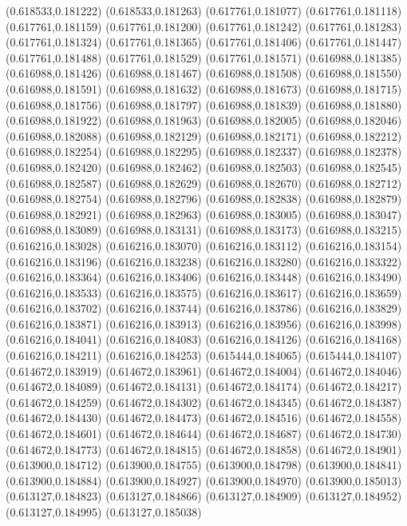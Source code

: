 (0.618533,0.181222)
(0.618533,0.181263)
(0.617761,0.181077)
(0.617761,0.181118)
(0.617761,0.181159)
(0.617761,0.181200)
(0.617761,0.181242)
(0.617761,0.181283)
(0.617761,0.181324)
(0.617761,0.181365)
(0.617761,0.181406)
(0.617761,0.181447)
(0.617761,0.181488)
(0.617761,0.181529)
(0.617761,0.181571)
(0.616988,0.181385)
(0.616988,0.181426)
(0.616988,0.181467)
(0.616988,0.181508)
(0.616988,0.181550)
(0.616988,0.181591)
(0.616988,0.181632)
(0.616988,0.181673)
(0.616988,0.181715)
(0.616988,0.181756)
(0.616988,0.181797)
(0.616988,0.181839)
(0.616988,0.181880)
(0.616988,0.181922)
(0.616988,0.181963)
(0.616988,0.182005)
(0.616988,0.182046)
(0.616988,0.182088)
(0.616988,0.182129)
(0.616988,0.182171)
(0.616988,0.182212)
(0.616988,0.182254)
(0.616988,0.182295)
(0.616988,0.182337)
(0.616988,0.182378)
(0.616988,0.182420)
(0.616988,0.182462)
(0.616988,0.182503)
(0.616988,0.182545)
(0.616988,0.182587)
(0.616988,0.182629)
(0.616988,0.182670)
(0.616988,0.182712)
(0.616988,0.182754)
(0.616988,0.182796)
(0.616988,0.182838)
(0.616988,0.182879)
(0.616988,0.182921)
(0.616988,0.182963)
(0.616988,0.183005)
(0.616988,0.183047)
(0.616988,0.183089)
(0.616988,0.183131)
(0.616988,0.183173)
(0.616988,0.183215)
(0.616216,0.183028)
(0.616216,0.183070)
(0.616216,0.183112)
(0.616216,0.183154)
(0.616216,0.183196)
(0.616216,0.183238)
(0.616216,0.183280)
(0.616216,0.183322)
(0.616216,0.183364)
(0.616216,0.183406)
(0.616216,0.183448)
(0.616216,0.183490)
(0.616216,0.183533)
(0.616216,0.183575)
(0.616216,0.183617)
(0.616216,0.183659)
(0.616216,0.183702)
(0.616216,0.183744)
(0.616216,0.183786)
(0.616216,0.183829)
(0.616216,0.183871)
(0.616216,0.183913)
(0.616216,0.183956)
(0.616216,0.183998)
(0.616216,0.184041)
(0.616216,0.184083)
(0.616216,0.184126)
(0.616216,0.184168)
(0.616216,0.184211)
(0.616216,0.184253)
(0.615444,0.184065)
(0.615444,0.184107)
(0.614672,0.183919)
(0.614672,0.183961)
(0.614672,0.184004)
(0.614672,0.184046)
(0.614672,0.184089)
(0.614672,0.184131)
(0.614672,0.184174)
(0.614672,0.184217)
(0.614672,0.184259)
(0.614672,0.184302)
(0.614672,0.184345)
(0.614672,0.184387)
(0.614672,0.184430)
(0.614672,0.184473)
(0.614672,0.184516)
(0.614672,0.184558)
(0.614672,0.184601)
(0.614672,0.184644)
(0.614672,0.184687)
(0.614672,0.184730)
(0.614672,0.184773)
(0.614672,0.184815)
(0.614672,0.184858)
(0.614672,0.184901)
(0.613900,0.184712)
(0.613900,0.184755)
(0.613900,0.184798)
(0.613900,0.184841)
(0.613900,0.184884)
(0.613900,0.184927)
(0.613900,0.184970)
(0.613900,0.185013)
(0.613127,0.184823)
(0.613127,0.184866)
(0.613127,0.184909)
(0.613127,0.184952)
(0.613127,0.184995)
(0.613127,0.185038)
